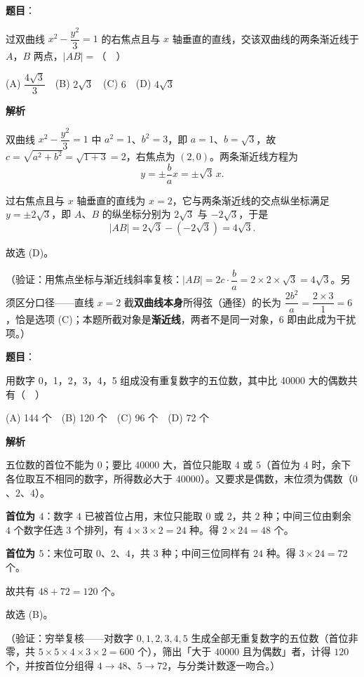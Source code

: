\begin{answer}

\textbf{题目}：

过双曲线 \(x^2-\dfrac{y^2}{3}=1\) 的右焦点且与 \(x\) 轴垂直的直线，交该双曲线的两条渐近线于 \(A\)，\(B\) 两点，\(|AB| =\)（　）

(A) \(\dfrac{4\sqrt{3}}{3}\)　(B) \(2\sqrt{3}\)　(C) \(6\)　(D) \(4\sqrt{3}\)

\textbf{解析}

双曲线 \(x^2-\dfrac{y^2}{3}=1\) 中 \(a^2=1\)、\(b^2=3\)，即 \(a=1\)、\(b=\sqrt{3}\)，故 \(c=\sqrt{a^2+b^2}=\sqrt{1+3}=2\)，右焦点为 \((2,0)\)。两条渐近线方程为
\nopagebreak[4]
\[
y=\pm\dfrac{b}{a} x=\pm\sqrt{3}\,x .
\]

过右焦点且与 \(x\) 轴垂直的直线为 \(x=2\)，它与两条渐近线的交点纵坐标满足 \(y=\pm2\sqrt{3}\)，即 \(A\)、\(B\) 的纵坐标分别为 \(2\sqrt{3}\) 与 \(-2\sqrt{3}\)，于是
\nopagebreak[4]
\[
|AB|=2\sqrt{3}-\left(-2\sqrt{3}\right)=4\sqrt{3} .
\]

故选 (D)。

（验证：用焦点坐标与渐近线斜率复核：\(|AB|=2c\cdot\dfrac{b}{a}=2\times2\times\sqrt{3}=4\sqrt{3}\)。另须区分口径——直线 \(x=2\) 截\textbf{双曲线本身}所得弦（通径）的长为 \(\dfrac{2b^2}{a}=\dfrac{2\times3}{1}=6\)，恰是选项 (C)；本题所截对象是\textbf{渐近线}，两者不是同一对象，6 即由此成为干扰项。）


\end{answer}
\begin{answer}

\textbf{题目}：

用数字 0，1，2，3，4，5 组成没有重复数字的五位数，其中比 40000 大的偶数共有（　）

(A) 144 个　(B) 120 个　(C) 96 个　(D) 72 个

\textbf{解析}

五位数的首位不能为 \(0\)；要比 \(40000\) 大，首位只能取 \(4\) 或 \(5\)（首位为 \(4\) 时，余下各位取互不相同的数字，所得数必大于 \(40000\)）。又要求是偶数，末位须为偶数（\(0\)、\(2\)、\(4\)）。

\textbf{首位为 \(4\)}：数字 \(4\) 已被首位占用，末位只能取 \(0\) 或 \(2\)，共 \(2\) 种；中间三位由剩余 \(4\) 个数字任选 \(3\) 个排列，有 \(4\times3\times2=24\) 种。得 \(2\times24=48\) 个。

\textbf{首位为 \(5\)}：末位可取 \(0\)、\(2\)、\(4\)，共 \(3\) 种；中间三位同样有 \(24\) 种。得 \(3\times24=72\) 个。

故共有 \(48+72=120\) 个。

故选 (B)。

（验证：穷举复核——对数字 \(0,1,2,3,4,5\) 生成全部无重复数字的五位数（首位非零，共 \(5\times5\times4\times3\times2=600\) 个），筛出「大于 \(40000\) 且为偶数」者，计得 \(120\) 个，并按首位分组得 \(4\to48\)、\(5\to72\)，与分类计数逐一吻合。）


\end{answer}
